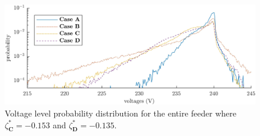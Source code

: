 \begin{figure}\centering
 \includegraphics{_chapter4/fig/voltage-probabilities}
 \caption{Voltage level probability distribution for the entire feeder where\protect\linebreak $\zeta_\textbf{C}^{*}=-0.153$ and $\zeta_\textbf{D}^{*}=-0.135$.}
 \label{ch4:fig:voltage-probabilities}
\end{figure}
